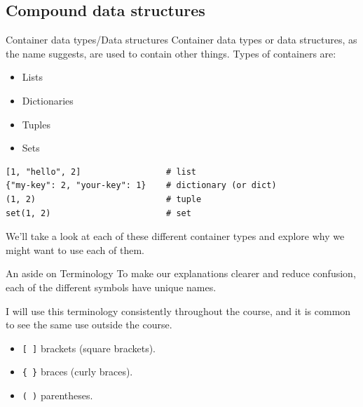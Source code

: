\documentclass[10pt]{beamer}
\begin{document}
\subsection{Compound data structures}
\label{sec:org3e69100}
\begin{frame}[label={sec:orgf746875},fragile]{Container data types/Data structures}
 Container data types or data structures, as the name suggests, are used to contain
other things. Types of containers are:

\begin{itemize}
\item Lists
\item Dictionaries
\item Tuples
\item Sets
\end{itemize}

\begin{verbatim}
[1, "hello", 2]                 # list
{"my-key": 2, "your-key": 1}    # dictionary (or dict)
(1, 2)                          # tuple
set(1, 2)                       # set
\end{verbatim}

We'll take a look at each of these different container types and explore why we
might want to use each of them.
\end{frame}

\begin{frame}[label={sec:org7ad1782},fragile]{An aside on Terminology}
 To make our explanations clearer and reduce confusion, each of the different symbols
have unique names.

I will use this terminology consistently throughout the course, and it is common to
see the same use outside the course.

\begin{itemize}
\item \texttt{[ ]} brackets (square brackets).
\item \texttt{\{ \}} braces (curly braces).
\item \texttt{( )} parentheses.
\end{itemize}
\end{frame}
\end{document}
